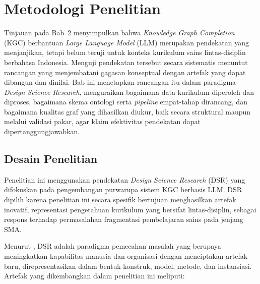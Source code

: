 \documentclass[../../thesis]{subfiles}
\begin{document}
\ifSubfilesClassLoaded{}{\setcounter{chapter}{2}}

\chapter{Metodologi Penelitian}

Tinjauan pada Bab~2 menyimpulkan bahwa \textit{Knowledge Graph Completion}
(KGC) berbantuan \textit{Large Language Model} (LLM) merupakan pendekatan yang
menjanjikan, tetapi belum teruji untuk konteks kurikulum sains lintas-disiplin
berbahasa Indonesia. Menguji pendekatan tersebut secara sistematis menuntut
rancangan yang menjembatani gagasan konseptual dengan artefak yang dapat
dibangun dan dinilai. Bab ini menetapkan rancangan itu dalam paradigma
\textit{Design Science Research}, menguraikan bagaimana data kurikulum diperoleh
dan diproses, bagaimana skema ontologi serta \textit{pipeline} empat-tahap
dirancang, dan bagaimana kualitas graf yang dihasilkan diukur, baik secara
struktural maupun melalui validasi pakar, agar klaim efektivitas pendekatan
dapat dipertanggungjawabkan.

\section{Desain Penelitian}

Penelitian ini menggunakan pendekatan \textit{Design Science Research}
(DSR) yang difokuskan pada pengembangan purwarupa sistem KGC berbasis
LLM. DSR dipilih karena penelitian ini secara spesifik bertujuan
menghasilkan artefak inovatif, representasi pengetahuan kurikulum yang
bersifat lintas-disiplin, sebagai respons terhadap permasalahan
fragmentasi pembelajaran sains pada jenjang SMA.

Menurut \textcite{hevner_design_2004}, DSR adalah paradigma pemecahan masalah
yang berupaya meningkatkan kapabilitas manusia dan organisasi dengan
menciptakan artefak baru, direpresentasikan dalam bentuk konstruk,
model, metode, dan instansiasi. Artefak yang dikembangkan dalam
penelitian ini meliputi:
\end{document}

